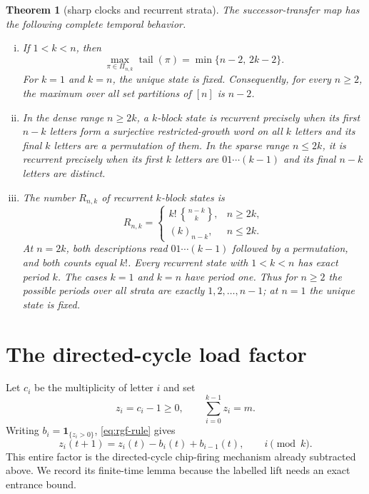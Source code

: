 \documentclass[a4paper,10pt]{amsart}
\newtheorem{theorem}{Theorem}
\theoremstyle{definition}
\theoremstyle{remark}
\newcommand{\ind}{\mathbf 1}
\newcommand{\tail}{\operatorname{tail}}
\newcommand{\Stirling}[2]{\genfrac\{\}{0pt}{}{#1}{#2}}
\begin{document}
\begin{theorem}[sharp clocks and recurrent strata]\label{thm:temporal}
The successor-transfer map has the following complete temporal behavior.
\begin{enumerate}[(i)]
\item If $1<k<n$, then
\begin{equation}\label{eq:clock}
 \max_{\pi\in\Pi_{n,k}}\tail(\pi)=\min\{n-2,\,2k-2\}.
\end{equation}
For $k=1$ and $k=n$, the unique state is fixed.  Consequently, for every
$n\ge2$, the maximum over all set partitions of $[n]$ is $n-2$.

\item In the dense range $n\ge2k$, a $k$-block state is recurrent precisely
when its first $n-k$ letters form a surjective restricted-growth word on all
$k$ letters and its final $k$ letters are a permutation of them.  In the
sparse range $n\le2k$, it is recurrent precisely when its first $k$ letters
are $01\cdots(k-1)$ and its final $n-k$ letters are distinct.

\item The number $R_{n,k}$ of recurrent $k$-block states is
\begin{equation}\label{eq:recurrent-count}
 R_{n,k}=
 \begin{cases}
 k!\,\Stirling{n-k}{k},&n\ge2k,\\[2mm]
 (k)_{n-k},&n\le2k.
 \end{cases}
\end{equation}
At $n=2k$, both descriptions read $01\cdots(k-1)$ followed by a
permutation, and both counts equal $k!$.  Every recurrent state with
$1<k<n$ has exact period $k$.  The cases $k=1$ and $k=n$ have period one.
Thus for $n\ge2$ the possible periods over all strata are exactly
$1,2,\ldots,n-1$; at $n=1$ the unique state is fixed.
\end{enumerate}
\end{theorem}

\section{The directed-cycle load factor}

Let $c_i$ be the multiplicity of letter $i$ and set
\[
 z_i=c_i-1\ge0,\qquad \sum_{i=0}^{k-1}z_i=m.
\]
Writing $b_i=\ind_{\{z_i>0\}}$, \eqref{eq:rgf-rule} gives
\begin{equation}\label{eq:queue}
 z_i(t+1)=z_i(t)-b_i(t)+b_{i-1}(t),
 \qquad i\pmod{k}.
\end{equation}
This entire factor is the directed-cycle chip-firing mechanism already
subtracted above.  We record its finite-time lemma because the labelled lift
needs an exact entrance bound.
\end{document}

